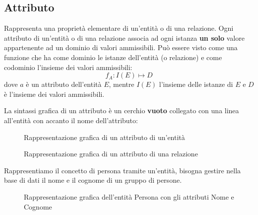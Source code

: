\documentclass[a4paper]{article}
\begin{document}
\subsection{Attributo}
Rappresenta una proprietà elementare di un'entità o di una relazione.
Ogni attributo di un'entità o di una relazione associa ad ogni istanza \textbf{un solo}
valore appartenente ad un dominio di valori ammissibili. Può essere visto
come una funzione che ha come dominio le istanze dell'entità (o relazione) e come
codominio l'insieme dei valori ammissibili:
\[
  f_A: I(E) \mapsto D
\] 
dove \( a \) è un attributo dell'entità \( E \), mentre \( I(E) \) l'insieme delle
istanze di \( E \) e \( D \) è l'insieme dei valori ammissibili.

\vspace{1em}
\noindent
La sintassi grafica di un attributo è un cerchio \textbf{vuoto} collegato con una linea all'entità
con accanto il nome dell'attributo:
\begin{figure}[H]
  \centering
  \caption{Rappresentazione grafica di un attributo di un'entità}
\end{figure}

\begin{figure}[H]
  \centering
  \caption{Rappresentazione grafica di un attributo di una relazione}
\end{figure}

\begin{example}
  Rappresentiamo il concetto di persona tramite un'entità, bisogna gestire nella base
  di dati il nome e il cognome di un gruppo di persone.
  \begin{figure}[H]
    \centering
    \caption{Rappresentazione grafica dell'entità Persona con gli attributi Nome e Cognome}
  \end{figure}
\end{example}
\end{document}
